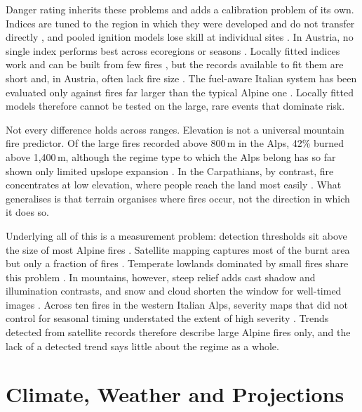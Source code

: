 \documentclass[11pt,a4paper]{article}
\begin{document}
Danger rating inherits these problems and adds a calibration problem of its own. Indices are tuned to the region in which they were developed and do not transfer directly \citep{de_angelis_modelling_2015}, and pooled ignition models lose skill at individual sites \citep{gelabert_assessing_2025}. In Austria, no single index performs best across ecoregions or seasons \citep{arpaci_selecting_2013}. Locally fitted indices work and can be built from few fires \citep{de_angelis_modelling_2015}, but the records available to fit them are short \citep{conedera_characterizing_2018} and, in Austria, often lack fire size \citep{arpaci_selecting_2013}. The fuel-aware Italian system has been evaluated only against fires far larger than the typical Alpine one \citep{perello_fuelaware_2025}. Locally fitted models therefore cannot be tested on the large, rare events that dominate risk.

Not every difference holds across ranges. Elevation is not a universal mountain fire predictor. Of the large fires recorded above 800\,m in the Alps, 42\% burned above 1{,}400\,m, although the regime type to which the Alps belong has so far shown only limited upslope expansion \citep{beloiu_climatedriven_2026}. In the Carpathians, by contrast, fire concentrates at low elevation, where people reach the land most easily \citep{manczinger_fire_2025}. What generalises is that terrain organises where fires occur, not the direction in which it does so.

Underlying all of this is a measurement problem: detection thresholds sit above the size of most Alpine fires \citep{muller_forest_2020, beloiu_climatedriven_2026}. Satellite mapping captures most of the burnt area but only a fraction of fires \citep{jrc_advance_2026}. Temperate lowlands dominated by small fires share this problem \citep{stoof_temperate_2024}. In mountains, however, steep relief adds cast shadow and illumination contrasts, and snow and cloud shorten the window for well-timed images \citep{morresi_mapping_2022}. Across ten fires in the western Italian Alps, severity maps that did not control for seasonal timing understated the extent of high severity \citep{morresi_mapping_2022}. Trends detected from satellite records therefore describe large Alpine fires only, and the lack of a detected trend says little about the regime as a whole.

\section{Climate, Weather and Projections}
\label{sec:climate}
\end{document}
